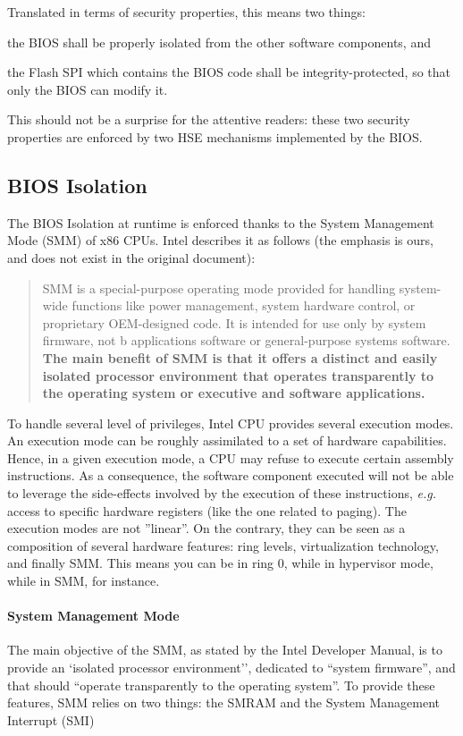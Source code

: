 Translated in terms of security properties, this means two things:
%
\begin{inparaenum}[(1)]
\item the BIOS shall be properly isolated from the other software components,
  and
\item the Flash SPI which contains the BIOS code shall be integrity-protected,
  so that only the BIOS can modify it.
\end{inparaenum}
%
This should not be a surprise for the attentive readers: these two security
properties are enforced by two HSE mechanisms implemented by the BIOS.

\subsection{BIOS Isolation}

The BIOS Isolation at runtime is enforced thanks to the System Management Mode
(SMM) of x86 CPUs.
%
Intel describes it as follows (the emphasis is ours, and does not exist in the
original document):

\begin{quote}
  SMM is a special-purpose operating mode provided for handling system-wide
  functions like power management, system hardware control, or proprietary
  OEM-designed code.
  It is intended for use only by system firmware, not b applications software or
  general-purpose systems software.
  \textbf{The main benefit of SMM is that it offers a distinct and easily
    isolated processor environment that operates transparently to the operating
    system or executive and software applications.}
\end{quote}

To handle several level of privileges, Intel CPU provides several execution
modes.
%
An execution mode can be roughly assimilated to a set of hardware capabilities.
%
Hence, in a given execution mode, a CPU may refuse to execute certain assembly
instructions.
%
As a consequence, the software component executed will not be able to leverage
the side-effects involved by the execution of these instructions, \emph{e.g.}
access to specific hardware registers (like the one related to paging).
%
The execution modes are not ''linear''.
%
On the contrary, they can be seen as a composition of several hardware features:
ring levels, virtualization technology, and finally SMM.
%
This means you can be in ring 0, while in hypervisor mode, while in SMM, for
instance.

\paragraph{System Management Mode}
%
The main objective of the SMM, as stated by the Intel Developer Manual, is to
provide an `isolated processor environment'', dedicated to ``system firmware'',
and that should ``operate transparently to the operating system''.
%
To provide these features, SMM relies on two things: the SMRAM and the System
Management Interrupt (SMI)

